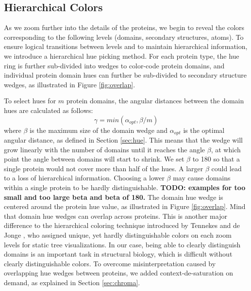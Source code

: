 \documentclass{egpubl}
\begin{document}
	\subsection{Hierarchical Colors}
	\label{sec:hierarchy}
	
	
	
	As we zoom further into the details of the proteins, we begin to reveal the colors corresponding to the following levels (domains, secondary structures, atoms). 
	To ensure logical transitions between levels and to maintain hierarchical information, we introduce a hierarchical hue picking method. 
	For each protein type, the hue ring is further sub-divided into wedges to color-code protein domains, and individual protein domain hues can further be sub-divided to secondary structure wedges, as illustrated in Figure \ref{fig:overlap}. 
	
	To select hues for $m$ protein domains, the angular distances between the domain hues are calculated as follows: 
	\[
	\gamma = min(\alpha_{opt}, \beta / m)
	\]
	where $\beta$ is the maximum size of the domain wedge and $\alpha_{opt}$ is the optimal angular distance, as defined in Section \ref{sec:hue}.
	This means that the wedge will grow linearly with the number of domains until it reaches the angle $\beta$, at which point the angle between domains will start to shrink. 
	We set $\beta$ to 180 so that a single protein would not cover more than half of the hues. 
	A larger $\beta$ could lead to a loss of hierarchical information. 
	Choosing a lower $\beta$ may cause domains within a single protein to be hardly distinguishable.  
	\textbf{TODO: examples for too small and too large beta and beta of 180. }
	The domain hue wedge is centered around the protein hue value, as illustrated in Figure \ref{fig:overlap}.
	Mind that domain hue wedges can overlap across proteins. 
	This is another major difference to the hierarchical coloring technique introduced by Tennekes and de Jonge \cite{tennekes2014tree}, who assigned unique, yet hardly distinguishable colors on each zoom levels for static tree visualizations. 
	In our case, being able to clearly distinguish domains is an important task in structural biology, which is difficult without clearly distinguishable colors. 
	To overcome misinterpretation caused by overlapping hue wedges between proteins, we added context-de-saturation on demand, as explained in Section \ref{sec:chroma}. 
	
\end{document}
